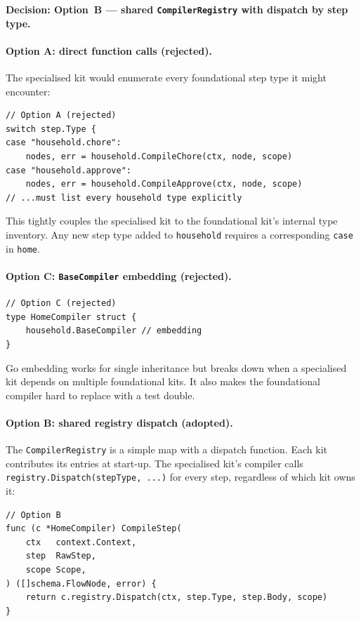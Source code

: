 \textbf{Decision: Option~B --- shared \texttt{CompilerRegistry} with dispatch
by step type.}

\paragraph{Option A: direct function calls (rejected).}

The specialised kit would enumerate every foundational step type it might
encounter:

\begin{verbatim}
// Option A (rejected)
switch step.Type {
case "household.chore":
    nodes, err = household.CompileChore(ctx, node, scope)
case "household.approve":
    nodes, err = household.CompileApprove(ctx, node, scope)
// ...must list every household type explicitly
\end{verbatim}

This tightly couples the specialised kit to the foundational kit's internal
type inventory.  Any new step type added to \texttt{household} requires a
corresponding \texttt{case} in \texttt{home}.

\paragraph{Option C: \texttt{BaseCompiler} embedding (rejected).}

\begin{verbatim}
// Option C (rejected)
type HomeCompiler struct {
    household.BaseCompiler // embedding
}
\end{verbatim}

Go embedding works for single inheritance but breaks down when a specialised
kit depends on multiple foundational kits.  It also makes the foundational
compiler hard to replace with a test double.

\paragraph{Option B: shared registry dispatch (adopted).}

The \texttt{CompilerRegistry} is a simple map with a dispatch function.  Each
kit contributes its entries at start-up.  The specialised kit's compiler calls
\texttt{registry.Dispatch(stepType,~...)} for every step, regardless of which
kit owns it:

\begin{verbatim}
// Option B
func (c *HomeCompiler) CompileStep(
    ctx   context.Context,
    step  RawStep,
    scope Scope,
) ([]schema.FlowNode, error) {
    return c.registry.Dispatch(ctx, step.Type, step.Body, scope)
}
\end{verbatim}

